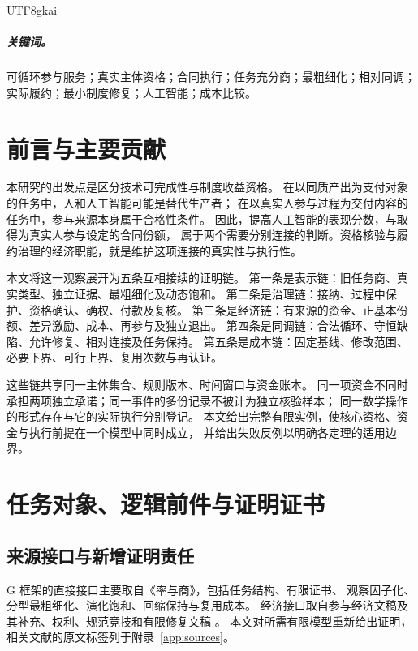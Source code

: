 \documentclass[12pt,a4paper,openany]{report}
\begin{document}
\begin{CJK*}{UTF8}{gkai}
\paragraph{关键词。}
可循环参与服务；真实主体资格；合同执行；任务充分商；最粗细化；相对同调；
实际履约；最小制度修复；人工智能；成本比较。

\chapter*{前言与主要贡献}
本研究的出发点是区分技术可完成性与制度收益资格。
在以同质产出为支付对象的任务中，人和人工智能可能是替代生产者；
在以真实人参与过程为交付内容的任务中，参与来源本身属于合格性条件。
因此，提高人工智能的表现分数，与取得为真实人参与设定的合同份额，
属于两个需要分别连接的判断。资格核验与履约治理的经济职能，就是维护这项连接的真实性与执行性。

本文将这一观察展开为五条互相接续的证明链。
第一条是表示链：旧任务商、真实类型、独立证据、最粗细化及动态饱和。
第二条是治理链：接纳、过程中保护、资格确认、确权、付款及复核。
第三条是经济链：有来源的资金、正基本份额、差异激励、成本、再参与及独立退出。
第四条是同调链：合法循环、守恒缺陷、允许修复、相对连接及任务保持。
第五条是成本链：固定基线、修改范围、必要下界、可行上界、复用次数与再认证。

这些链共享同一主体集合、规则版本、时间窗口与资金账本。
同一项资金不同时承担两项独立承诺；同一事件的多份记录不被计为独立核验样本；
同一数学操作的形式存在与它的实际执行分别登记。
本文给出完整有限实例，使核心资格、资金与执行前提在一个模型中同时成立，
并给出失败反例以明确各定理的适用边界。

\clearpage
\tableofcontents
\clearpage
{}

\chapter{任务对象、逻辑前件与证明证书}
\label{ch:objects}

\section{来源接口与新增证明责任}
\label{sec:sources}
G 框架的直接接口主要取自《率与商》，包括任务结构、有限证书、
观察因子化、分型最粗细化、演化饱和、回缩保持与复用成本\cite{GRate}。
经济接口取自参与经济文稿及其补充、权利、规范竞技和有限修复文稿
\cite{EMarket,EGovernance,ERights,ECompetition,ERepair}。
本文对所需有限模型重新给出证明，相关文献的原文标签列于附录~\ref{app:sources}。


\end{CJK*}
\end{document}

